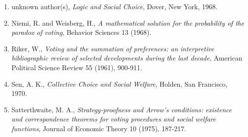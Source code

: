 \documentclass{article}
\begin{document}
\begin{enumerate}[1.]
  \item unknown author(s), \emph{Logic and Social Choice}, Dover, New York, 1968.
  \item Niemi, R. and Weisberg, H., \emph{A mathematical solution for the probability of the paradox of voting}, Behavior Sciences 13 (1968).
  \item Riker, W., \emph{Voting and the summation of preferences: an interpretive bibliographic review of selected developments during the last decade}, American Political Science Review 55 (1961), 900-911.
  \item Sen, A. K., \emph{Collective Choice and Social Welfare}, Holden, San Francisco, 1970.
  \item Satterthwaite, M. A., \emph{Strategy-proofness and Arrow's conditions: existence and correspondence theorems for voting procedures and social welfare functions}, Journal of Economic Theory 10 (1975), 187-217.
\end{enumerate}
\end{document}
